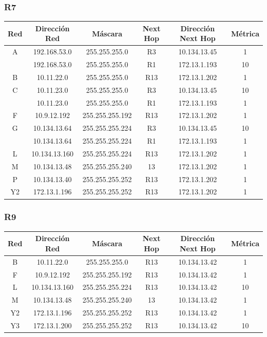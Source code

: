 \documentclass[12pt, a4paper, spanish]{article}
\begin{document}
\subsubsection{R7}
\begin{center}
\begin{tabular}{|c|c|c|c|c|c|}
	\hline
	Red & Dirección Red & Máscara & Next Hop & Dirección Next Hop & Métrica \\
	\hline
	\hline
	A & 192.168.53.0 & 255.255.255.0 & R3 & 10.134.13.45 & 1\\
	 & 192.168.53.0 & 255.255.255.0 & R1 & 172.13.1.193 & 10\\
	\hline
	B & 10.11.22.0 & 255.255.255.0 & R13 & 172.13.1.202 & 1\\
	\hline
	C & 10.11.23.0 & 255.255.255.0 & R3 & 10.134.13.45 & 10\\
	 & 10.11.23.0 & 255.255.255.0 & R1 & 172.13.1.193 & 1\\
	\hline
	F & 10.9.12.192 & 255.255.255.192 & R13 & 172.13.1.202 & 1\\
	\hline
	G & 10.134.13.64 & 255.255.255.224 & R3 & 10.134.13.45 & 10\\
	 & 10.134.13.64 & 255.255.255.224 & R1 & 172.13.1.193 & 1\\
	\hline
	L & 10.134.13.160 & 255.255.255.224 & R13 & 172.13.1.202 & 1\\
	\hline
	M & 10.134.13.48 & 255.255.255.240 & 13 & 172.13.1.202 & 1\\
	\hline
	P & 10.134.13.40 & 255.255.255.252 & R13 & 172.13.1.202 & 1\\
	\hline
	Y2 & 172.13.1.196 & 255.255.255.252 & R13 & 172.13.1.202 & 1\\
	\hline
\end{tabular}
\end{center}

\subsubsection{R9}
\begin{center}
\begin{tabular}{|c|c|c|c|c|c|}
	\hline
	Red & Dirección Red & Máscara & Next Hop & Dirección Next Hop & Métrica \\
	\hline
	\hline
	B & 10.11.22.0 & 255.255.255.0 & R13 & 10.134.13.42 & 1\\
	\hline
	F & 10.9.12.192 & 255.255.255.192 & R13 & 10.134.13.42 & 1\\
	\hline
	L & 10.134.13.160 & 255.255.255.224 & R13 & 10.134.13.42 & 10\\
	\hline
	M & 10.134.13.48 & 255.255.255.240 & 13 & 10.134.13.42 & 1\\
	\hline
	Y2 & 172.13.1.196 & 255.255.255.252 & R13 & 10.134.13.42 & 1\\
	\hline
	Y3 & 172.13.1.200 & 255.255.255.252 & R13 & 10.134.13.42 & 10\\
	\hline
\end{tabular}
\end{center}
\end{document}
